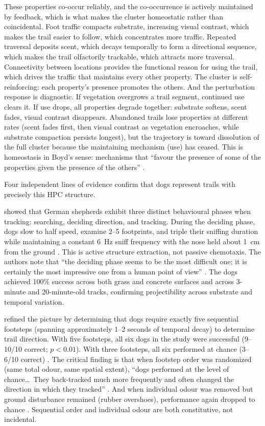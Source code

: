 \documentclass[12pt]{article}
\begin{document}
These properties co-occur reliably, and the co-occurrence is actively maintained by feedback, which is what makes the cluster homeostatic rather than coincidental. Foot traffic compacts substrate, increasing visual contrast, which makes the trail easier to follow, which concentrates more traffic. Repeated traversal deposits scent, which decays temporally to form a directional sequence, which makes the trail olfactorily trackable, which attracts more traversal. Connectivity between locations provides the functional reason for using the trail, which drives the traffic that maintains every other property. The cluster is self-reinforcing: each property's presence promotes the others. And the perturbation response is diagnostic. If vegetation overgrows a trail segment, continued use clears it. If use drops, all properties degrade together: substrate softens, scent fades, visual contrast disappears. Abandoned trails lose properties at different rates (scent fades first, then visual contrast as vegetation encroaches, while substrate compaction persists longest), but the trajectory is toward dissolution of the full cluster because the maintaining mechanism (use) has ceased. This is homeostasis in Boyd's sense: mechanisms that \enquote{favour the presence of some of the properties given the presence of the others} \citep[526]{boyd1979}.

Four independent lines of evidence confirm that dogs represent trails with precisely this HPC structure.

\textcite{thesen1993} showed that German shepherds exhibit three distinct behavioural phases when tracking: searching, deciding direction, and tracking. During the deciding phase, dogs slow to half speed, examine 2--5 footprints, and triple their sniffing duration while maintaining a constant 6~Hz sniff frequency with the nose held about 1~cm from the ground \citep[250--251]{thesen1993}. This is active structure extraction, not passive chemotaxis. The authors note that \enquote{the deciding phase seems to be the most difficult one; it is certainly the most impressive one from a human point of view} \citep[251]{thesen1993}. The dogs achieved 100\% success across both grass and concrete surfaces and across 3-minute and 20-minute-old tracks, confirming projectibility across substrate and temporal variation.

\textcite{hepper2005} refined the picture by determining that dogs require exactly five sequential footsteps (spanning approximately 1--2 seconds of temporal decay) to determine trail direction. With five footsteps, all six dogs in the study were successful (9--10/10 correct; $p < 0.01$). With three footsteps, all six performed at chance (3--6/10 correct) \citep[296--297]{hepper2005}. The critical finding is that when footstep order was randomized (same total odour, same spatial extent), \enquote{dogs performed at the level of chance\ldots\ They back-tracked much more frequently and often changed the direction in which they tracked} \citep[294]{hepper2005}. And when individual odour was removed but ground disturbance remained (rubber overshoes), performance again dropped to chance \citep[295]{hepper2005}. Sequential order and individual odour are both constitutive, not incidental.
\end{document}
